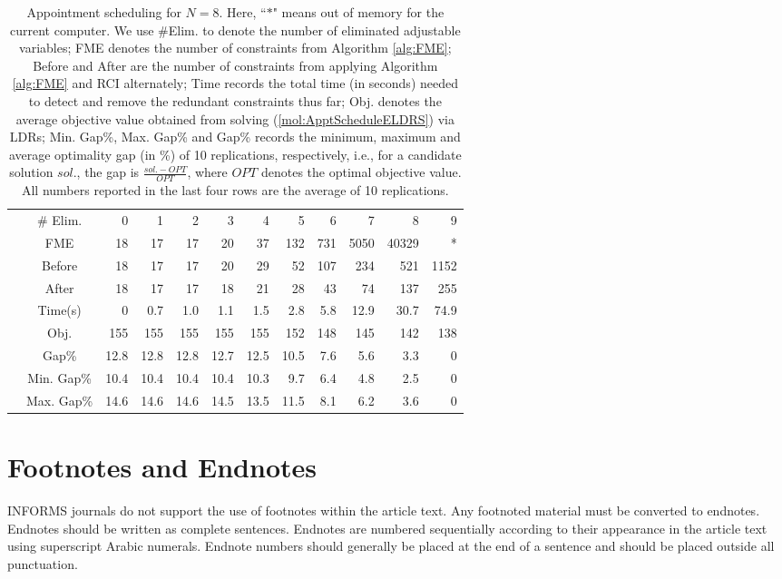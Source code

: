 \documentclass[fleqn,orsc,blindrev]{informs4}
\begin{document}
		\begin{table*}[t]
			\centering
			\caption{Appointment scheduling for $N=8$. Here, ``$*$" means out of memory for the current computer. We use \#Elim. to denote the number of eliminated adjustable variables; FME denotes the number of constraints from Algorithm \ref{alg:FME}; Before and After are the number of constraints from applying Algorithm \ref{alg:FME} and RCI alternately; Time records the total time (in seconds) needed to detect and remove the redundant constraints thus far; Obj. denotes the average objective value obtained from solving (\ref{mol:ApptScheduleELDRS}) via LDRs; Min. Gap\%, Max. Gap\% and Gap\% records the minimum, maximum and average optimality gap (in \%) of 10 replications, respectively, i.e., for a candidate solution $sol.$, the gap is $\frac{sol. - OPT}{OPT}$,  {where $OPT$ denotes the optimal objective value}. All numbers reported in the last four rows are the average of 10 replications.}
\def\arraystretch{1.3}			\begin{tabular}{rc|rrrrrrrrrr}
				\cline{2-12}
				& \# Elim. & 0     & 1     & 2     & 3     & 4     & 5     & 6     & 7     & 8     & 9 \\ \cline{2-12}
			 & FME   & 18    & 17    & 17    & 20    & 37    & 132   & 731   & 5050  & 40329 & * \\ 
				& Before & 18    & 17    & 17    & 20    & 29    & 52    & 107   & 234   & 521   & 1152 \\
				& After & 18    & 17    & 17    & 18    & 21    & 28    & 43    & 74    & 137   & 255 \\
				& Time(s)  & 0    & 0.7   & 1.0   & 1.1   & 1.5   & 2.8   & 5.8   & 12.9    & 30.7  & 74.9 \\ \cline{3-12}
				& Obj.  & 155   & 155   & 155   & 155   & 155   & 152   & 148   & 145   & 142   & 138 \\
				& Gap\% & 12.8  & 12.8  & 12.8  & 12.7  & 12.5  & 10.5  & 7.6   & 5.6   & 3.3   & 0 \\
				& Min. Gap\% & 10.4  & 10.4  & 10.4  & 10.4  & 10.3  & 9.7   & 6.4   & 4.8   & 2.5   & 0 \\
				& Max. Gap\% & 14.6  & 14.6  & 14.6  & 14.5  & 13.5  & 11.5  & 8.1   & 6.2   & 3.6   & 0 \\ \cline{2-12}
			\end{tabular}%
			\label{tab:AS}\vspace*{18pt}%
		\end{table*}%

\section{Footnotes and Endnotes}\label{footsection1}
INFORMS journals do not support the use of footnotes within the article text. Any footnoted material must be converted to endnotes. Endnotes should be written as complete sentences. Endnotes are numbered sequentially according to their appearance in the article text using superscript Arabic numerals. Endnote numbers should generally be placed at the end of a sentence and should be placed outside all punctuation.
\end{document}
